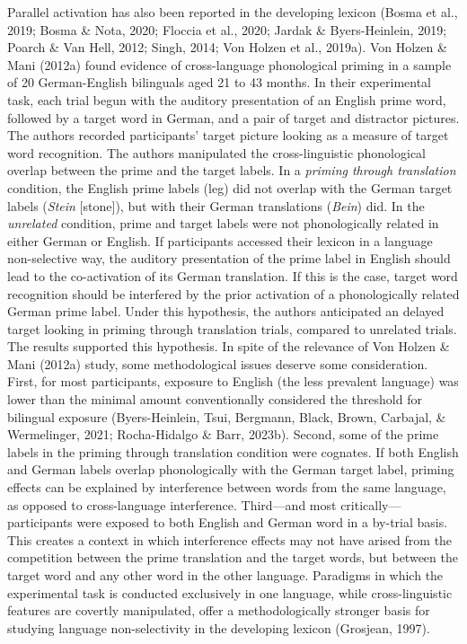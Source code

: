 \documentclass[
  12pt,
  b5paperpaper,
  twoside]{scrreprt}
\begin{document}
Parallel activation has also been reported in the developing lexicon
(Bosma et al., 2019; Bosma \& Nota, 2020; Floccia et al., 2020; Jardak
\& Byers-Heinlein, 2019; Poarch \& Van Hell, 2012; Singh, 2014; Von
Holzen et al., 2019a). Von Holzen \& Mani (2012a) found evidence of
cross-language phonological priming in a sample of 20 German-English
bilinguals aged 21 to 43 months. In their experimental task, each trial
begun with the auditory presentation of an English prime word, followed
by a target word in German, and a pair of target and distractor
pictures. The authors recorded participants' target picture looking as a
measure of target word recognition. The authors manipulated the
cross-linguistic phonological overlap between the prime and the target
labels. In a \emph{priming through translation} condition, the English
prime labels (leg) did not overlap with the German target labels
(\emph{Stein} {[}stone{]}), but with their German translations
(\emph{Bein}) did. In the \emph{unrelated} condition, prime and target
labels were not phonologically related in either German or English. If
participants accessed their lexicon in a language non-selective way, the
auditory presentation of the prime label in English should lead to the
co-activation of its German translation. If this is the case, target
word recognition should be interfered by the prior activation of a
phonologically related German prime label. Under this hypothesis, the
authors anticipated an delayed target looking in priming through
translation trials, compared to unrelated trials. The results supported
this hypothesis. In spite of the relevance of Von Holzen \& Mani (2012a)
study, some methodological issues deserve some consideration. First, for
most participants, exposure to English (the less prevalent language) was
lower than the minimal amount conventionally considered the threshold
for bilingual exposure (Byers-Heinlein, Tsui, Bergmann, Black, Brown,
Carbajal, \& Wermelinger, 2021; Rocha-Hidalgo \& Barr, 2023b). Second,
some of the prime labels in the priming through translation condition
were cognates. If both English and German labels overlap phonologically
with the German target label, priming effects can be explained by
interference between words from the same language, as opposed to
cross-language interference. Third---and most critically---participants
were exposed to both English and German word in a by-trial basis. This
creates a context in which interference effects may not have arised from
the competition between the prime translation and the target words, but
between the target word and any other word in the other language.
Paradigms in which the experimental task is conducted exclusively in one
language, while cross-linguistic features are covertly manipulated,
offer a methodologically stronger basis for studying language
non-selectivity in the developing lexicon (Grosjean, 1997).
\end{document}
